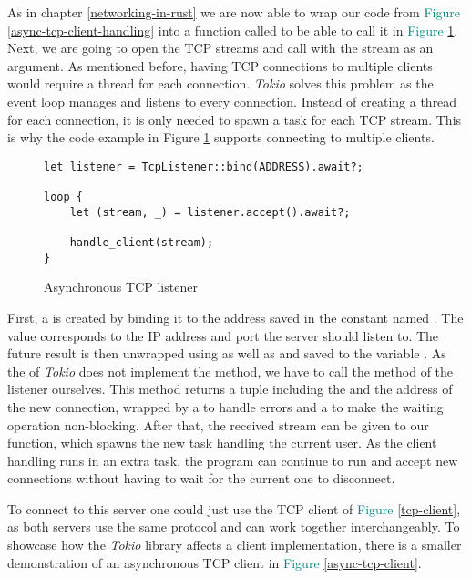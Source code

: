 As in chapter \ref{networking-in-rust} we are now able to wrap our code from
\textcolor{teal}{Figure \ref{async-tcp-client-handling}} into a function called  to be able to
call it in \textcolor{teal}{Figure \ref{async-tcp-listener}}. Next, we are going to open the TCP streams and call
 with the stream as an argument. As mentioned before, having TCP connections to multiple clients
would require a thread for each connection. \textit{Tokio} solves this problem as the event loop manages and listens to
every connection. Instead of creating a thread for each connection, it is only needed to spawn a task for each TCP
stream. This is why the code example in Figure \textcolor{teal}{\ref{async-tcp-listener}} supports connecting to
multiple clients.

\begin{figure}[ht]
    \begin{verbatim}
let listener = TcpListener::bind(ADDRESS).await?;

loop {
    let (stream, _) = listener.accept().await?;

    handle_client(stream);
}
    \end{verbatim}
    \caption{Asynchronous TCP listener}
    \label{async-tcp-listener}
\end{figure}

First, a  is created by binding it to the address saved in the  constant
named . The value corresponds to the IP address and port the server should listen to. The future result
is then unwrapped using  as well as  and saved to the variable . As the
 of \textit{Tokio} does not implement the  method, we have to call the 
method of the listener ourselves. This method returns a tuple including the  and the address of the new
connection, wrapped by a  to handle errors and a  to make the waiting operation non-blocking.
After that, the received stream can be given to our  function, which spawns the new task handling
the current user. As the client handling runs in an extra task, the program can continue to run and accept new
connections without having to wait for the current one to disconnect.

To connect to this server one could just use the TCP client of \textcolor{teal}{Figure \ref{tcp-client}}, as both
servers use the same protocol and can work together interchangeably. To showcase how the \textit{Tokio} library affects
a client implementation, there is a smaller demonstration of an asynchronous TCP client in
\textcolor{teal}{Figure \ref{async-tcp-client}}.

